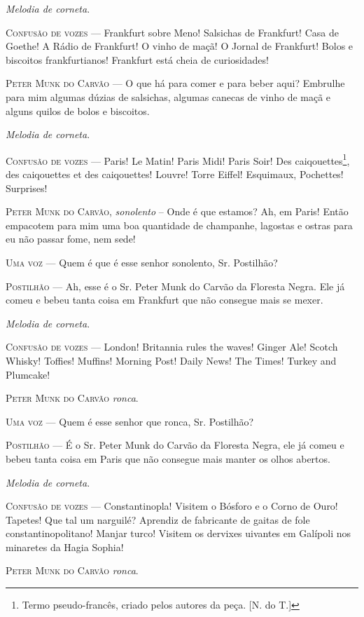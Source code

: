 \emph{Melodia de corneta}.

\textsc{Confusão de vozes} --- Frankfurt sobre Meno! Salsichas de Frankfurt! Casa
de Goethe! A Rádio de Frankfurt! O vinho de maçã! O Jornal de Frankfurt!
Bolos e biscoitos frankfurtianos! Frankfurt está cheia de curiosidades!

\textsc{Peter Munk do Carvão} --- O que há para comer e para beber aqui? Embrulhe
para mim algumas dúzias de salsichas, algumas canecas de vinho de maçã e
alguns quilos de bolos e biscoitos.

\emph{Melodia de corneta}.

\textsc{Confusão de vozes} --- Paris! Le Matin! Paris Midi! Paris Soir! Des
caiqouettes\footnote{Termo pseudo-francês, criado pelos autores da peça.
  [N. do T.]}, des caiqouettes et des caiqouettes! Louvre! Torre
Eiffel! Esquimaux, Pochettes! Surprises!

\textsc{Peter Munk do Carvão}, \emph{sonolento} -- Onde é que estamos? Ah, em
Paris! Então empacotem para mim uma boa quantidade de champanhe,
lagostas e ostras para eu não passar fome, nem sede!

\textsc{Uma voz} --- Quem é que é esse senhor sonolento, Sr. Postilhão?

\textsc{Postilhão} --- Ah, esse é o Sr. Peter Munk do Carvão da Floresta Negra.
Ele já comeu e bebeu tanta coisa em Frankfurt que não consegue mais se
mexer.

\emph{Melodia de corneta}.

\textsc{Confusão de vozes} --- London! Britannia rules the waves! Ginger Ale!
Scotch Whisky! Toffies! Muffins! Morning Post! Daily News! The Times!
Turkey and Plumcake!

\textsc{Peter Munk do Carvão} \emph{ronca}.

\textsc{Uma voz} --- Quem é esse senhor que ronca, Sr. Postilhão?

\textsc{Postilhão} --- É o Sr. Peter Munk do Carvão da Floresta Negra, ele já
comeu e bebeu tanta coisa em Paris que não consegue mais manter os olhos
abertos.

\emph{Melodia de corneta}.

\textsc{Confusão de vozes} --- Constantinopla! Visitem o Bósforo e o Corno de
Ouro! Tapetes! Que tal um narguilé? Aprendiz de fabricante de gaitas de
fole constantinopolitano! Manjar turco! Visitem os dervixes uivantes em
Galípoli nos minaretes da Hagia Sophia!

\textsc{Peter Munk do Carvão} \emph{ronca}.

